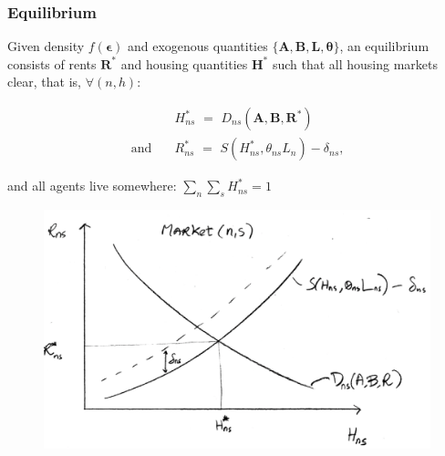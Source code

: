 \documentclass[aspectratio=149]{beamer}
\begin{document}
\begin{frame}
\frametitle{Equilibrium}
{\small
Given density $f(\bm{\epsilon})$ and exogenous quantities $\{\bm{A},\bm{B},\bm{L},\bm{\theta}\}$, an equilibrium consists of rents $\bm{R}^*$ and housing quantities $\bm{H}^*$ such that all housing markets clear, that is, $\forall (n,h)$:

\begin{equation*}
\begin{aligned}
& H^*_{ns} \,\, =\,\, D_{ns}(\bm{A},\bm{B},\bm{R}^*) \\
\text{and}\quad & R^*_{ns} \,\, =\,\, S(H^*_{ns},\theta_{ns}L_n) - \delta_{ns} \text{,}
\end{aligned}
\end{equation*} }


\noindent and all agents live somewhere: $\sum_{n}\sum_{s} H^*_{ns} = 1$

\begin{center}
\begin{figure}
\includegraphics[scale=0.16]{market.png}
\vspace{-3mm}
\end{figure}
\end{center}


\end{frame}

\end{document}
